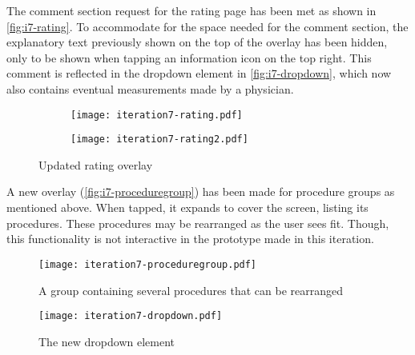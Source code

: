 The comment section request for the rating page has been met as shown in \autoref{fig:i7-rating}. To accommodate for the space needed for the comment section, the explanatory text previously shown on the top of the overlay has been hidden, only to be shown when tapping an information icon on the top right. This comment is reflected in the dropdown element in \autoref{fig:i7-dropdown}, which now also contains eventual measurements made by a physician.

\begin{sidewaysfigure}
    \centering
    \hspace{\fill}
    \begin{subfigure}[t]{0.4\textwidth}
        \centering
        \vspace{0pt}
        \texttt{[image: iteration7-rating.pdf]}
        \label{fig:i7-rating-1}
    \end{subfigure}
    \hspace{\fill}
    \begin{subfigure}[t]{0.4\textwidth}
        \centering
        \vspace{0pt}
        \texttt{[image: iteration7-rating2.pdf]}
        \label{fig:i7-rating-2}
    \end{subfigure}
    \hspace*{\fill}
    \caption{Updated rating overlay}
    \label{fig:i7-rating}
\end{sidewaysfigure}

A new overlay (\autoref{fig:i7-proceduregroup}) has been made for procedure groups as mentioned above. When tapped, it expands to cover the screen, listing its procedures. These procedures may be rearranged as the user sees fit. Though, this functionality is not interactive in the prototype made in this iteration.

\begin{sidewaysfigure}
    \centering
    \hspace{\fill}
    \begin{minipage}{0.4\textwidth}
        \centering
        \texttt{[image: iteration7-proceduregroup.pdf]}
        \caption{A group containing several procedures that can be rearranged}
        \label{fig:i7-proceduregroup}
    \end{minipage}
    \hspace{\fill}
    \begin{minipage}{0.3\textwidth}
        \centering
        \texttt{[image: iteration7-dropdown.pdf]}
        \caption{The new dropdown element}
        \label{fig:i7-dropdown}
    \end{minipage}
    \hspace*{\fill}
\end{sidewaysfigure}

